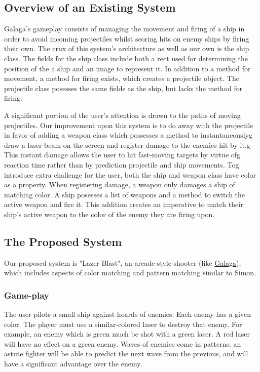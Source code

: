 \subsection*{Overview of an Existing System}
Galaga's gameplay consists of managing the movement and firing of a
ship in order to avoid incoming projectiles whilst scoring hits on
enemy ships by firing their own. The crux of this system's
architecture as well as our own is the ship class. The fields for
the ship class include both a rect used for determining the position
of the a ship and an image to represent it. In addition to a method
for movement, a method for firing exists, which creates a projectile
object. The projectile class posesses the same fields as the ship,
but lacks the method for firing.

A significant portion of the user's attention is drawn to the paths
of moving projectiles. Our improvement upon this system is to do
away with the projectile in favor of adding a weapon class which
possesses a method to instantaneouslyg draw a laser beam on the
screen and register damage to the enemies hit by it.g This instant
damage allows the user to hit fast-moving targets by virtue ofg
reaction time rather than by prediction projectile and ship
movements. Tog introduce extra challenge for the user, both the ship
and weapon class have color as a property. When registering damage,
a weapon only damages a ship of matching color. A ship posesses a
list of weapons and a method to switch the active weapon and fire
it. This addition creates an imperative to match their ship's active
weapon to the color of the enemy they are firing upon.

\subsection*{The Proposed System}
Our proposed system is "Lazer Blast", an arcade-style shooter (like
\href{https://en.wikipedia.org/wiki/Galaga}{Galaga}), which includes
aspects of color matching and pattern matching similar to Simon.

\subsubsection*{Game-play}
The user pilots a small ship against hoards of enemies.  Each enemy
has a given color.  The player must use a similar-colored laser to
destroy that enemy.  For example, an enemy which is green much be
shot with a green laser.  A red laser will have no effect on a green enemy.
Waves of enemies come in patterns: an astute fighter will be able to
predict the next wave from the previous, and will have a significant
advantage over the enemy.

